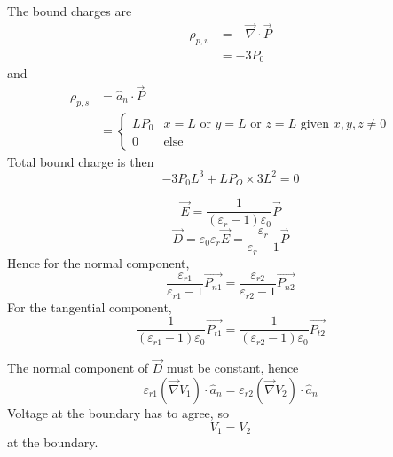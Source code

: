 \documentclass[answers]{exam}
\begin{document}
\begin{questions}
\begin{solution}
	The bound charges are
	\begin{align*}
		\rho_{p,v} &= -\vec{\nabla}\cdot\vec{P} \\
			   &= -3P_0
	\end{align*}
	and
	\begin{align*}
		\rho_{p,s} &= \hat{a}_n\cdot\vec{P} \\
			   &= \begin{cases} LP_0 & x=L \text{ or } y=L \text{ or } z=L \text{ given } x,y,z \neq 0 \\ 0 & \text{else} \end{cases}
	\end{align*}
	Total bound charge is then
	$$-3P_0L^3 + LP_O\times3L^2=0$$
\end{solution}


\begin{solution}
	$$\vec{E} = \frac{1}{(\varepsilon_r-1)\varepsilon_0}\vec{P}$$
	$$\vec{D} = \varepsilon_0\varepsilon_r\vec{E} = \frac{\varepsilon_r}{\varepsilon_r-1}\vec{P}$$
	Hence for the normal component,
	$$\frac{\varepsilon_{r1}}{\varepsilon_{r1}-1}\vec{P_{n1}} = \frac{\varepsilon_{r2}}{\varepsilon_{r2}-1}\vec{P_{n2}}$$
	For the tangential component,
	$$\frac{1}{(\varepsilon_{r1}-1)\varepsilon_0}\vec{P_{t1}} = \frac{1}{(\varepsilon_{r2}-1)\varepsilon_0}\vec{P_{t2}}$$
\end{solution}


\begin{solution}
	The normal component of $\vec{D}$ must be constant, hence
	$$\varepsilon_{r1}(\vec{\nabla}V_1)\cdot\hat{a}_n = \varepsilon_{r2}(\vec{\nabla}V_2)\cdot\hat{a}_n$$
	Voltage at the boundary has to agree, so
	$$V_1 = V_2$$
	at the boundary.
\end{solution}



\end{questions}
\end{document}
